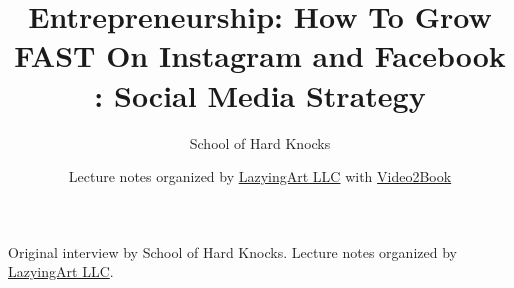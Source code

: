 \documentclass[11pt,oneside]{book}
\begin{document}
\frontmatter
\title{Entrepreneurship: How To Grow FAST On Instagram and Facebook : Social Media Strategy}
\author{School of Hard Knocks}
\date{Lecture notes organized by \href{https://lazying.art}{LazyingArt LLC} with \href{https://github.com/lachlanchen/Video2Book}{Video2Book}}
\maketitle
\begin{center}
\small Original interview by School of Hard Knocks. Lecture notes organized by \href{https://lazying.art}{LazyingArt LLC}.
\end{center}
\clearpage
\mainmatter

\end{document}
